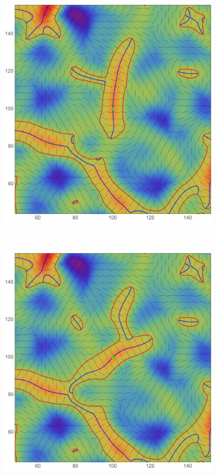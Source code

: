 \documentclass[a4paper, 11pt]{article}
\begin{document}
\begin{figure}
\centering
\begin{subfigure}[b]{0.31\textwidth}
\includegraphics[width=\textwidth]{Rotation_L_1}
\end{subfigure}~
\begin{subfigure}[b]{0.31\textwidth}
\includegraphics[width=\textwidth]{Rotation_L_2}

\end{subfigure}
\end{figure}
\end{document}
